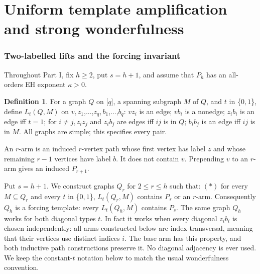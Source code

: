 \documentclass[11pt,a4paper]{article}
\theoremstyle{definition}
\newtheorem{definition}[theorem]{Definition}
\theoremstyle{remark}
\numberwithin{equation}{section}
\begin{document}
\part{Uniform template amplification and strong wonderfulness}

\section{Two-labelled lifts and the forcing invariant}\label{sec:lift}
Throughout Part I, fix \(h\ge2\), put \(s=h+1\), and assume that \(P_h\) has an all-orders EH exponent \(\kappa>0\).
\begin{definition}
For a graph \(Q\) on [\(q\)], a spanning subgraph \(M\) of \(Q\), and \(t\) in \{\(0,\allowbreak 1\)\}, define \(L_{t}(Q,\allowbreak M)\) on \(v,\allowbreak z_{1}\),...,\(z_{q},\allowbreak b_{1}\),...,\(b_{q}\): \(v z_{i}\) is an edge; \(v b_{i}\) is a nonedge; \(z_{i} b_{i}\) is an edge iff \(t=1\); for \(i\ne j,\allowbreak  z_{i} z_{j}\) and \(z_{i} b_{j}\) are edges iff \(ij\) is in \(Q\); \(b_{i} b_{j}\) is an edge iff \(ij\) is in \(M\). All graphs are simple; this specifies every pair.

An \(r\)-arm is an induced \(r\)-vertex path whose first vertex has label \(z\) and whose remaining \(r-1\) vertices have label \(b\). It does not contain \(v\). Prepending \(v\) to an \(r\)-arm gives an induced \(P_{r+1}\).
\end{definition}
Put \(s=h+1\). We construct graphs \(Q_{r}\) for \(2\le\allowbreak r\le\allowbreak h\) such that: \((\ast)\) for every \(M \subseteq  Q_{r}\) and every \(t\) in \{\(0,\allowbreak 1\)\}, \(L_{t}(Q_{r},\allowbreak M)\) contains \(P_{s}\) or an \(r\)-arm. Consequently \(Q_{h}\) is a forcing template: every \(L_{t}(Q_{h},\allowbreak M)\) contains \(P_{s}\). The same graph \(Q_{h}\) works for both diagonal types \(t\). In fact it works when every diagonal \(z_{i} b_{i}\) is chosen independently: all arms constructed below are index-transversal, meaning that their vertices use distinct indices \(i\). The base arm has this property, and both inductive path constructions preserve it. No diagonal adjacency is ever used. We keep the constant-\(t\) notation below to match the usual wonderfulness convention.
\end{document}
